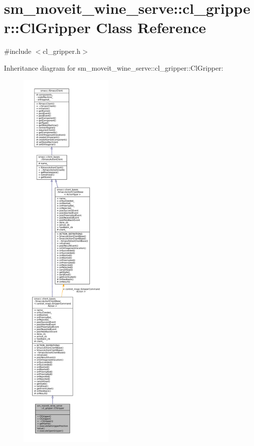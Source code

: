 \hypertarget{classsm__moveit__wine__serve_1_1cl__gripper_1_1ClGripper}{}\section{sm\+\_\+moveit\+\_\+wine\+\_\+serve\+:\+:cl\+\_\+gripper\+:\+:Cl\+Gripper Class Reference}
\label{classsm__moveit__wine__serve_1_1cl__gripper_1_1ClGripper}


{\ttfamily \#include $<$cl\+\_\+gripper.\+h$>$}



Inheritance diagram for sm\+\_\+moveit\+\_\+wine\+\_\+serve\+:\+:cl\+\_\+gripper\+:\+:Cl\+Gripper\+:
\nopagebreak
\begin{figure}[H]
\begin{center}
\leavevmode
\includegraphics[height=550pt]{classsm__moveit__wine__serve_1_1cl__gripper_1_1ClGripper__inherit__graph}
\end{center}
\end{figure}


